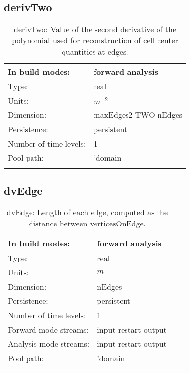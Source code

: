 \subsection[derivTwo]{derivTwo}
\label{subsec:var_sec_mesh_derivTwo}
\begin{center}
\begin{longtable}{| p{2.0in} | p{4.0in} |}
        \hline 
        In build modes: & \hyperref[subsec:forward_var_tab_mesh]{forward} \hyperref[subsec:analysis_var_tab_mesh]{analysis} \\
        \hline 
        Type: & real \\
        \hline 
        Units: & $m^{-2}$ \\
        \hline 
        Dimension: & maxEdges2 TWO nEdges \\
        \hline 
        Persistence: & persistent \\
        \hline 
        Number of time levels: & 1 \\
        \hline 
            Pool path: & 'domain %
 \\
		 \hline 
    \caption{derivTwo: Value of the second derivative of the polynomial used for reconstruction of cell center quantities at edges.}
\end{longtable}
\end{center}
\subsection[dvEdge]{dvEdge}
\label{subsec:var_sec_mesh_dvEdge}
\begin{center}
\begin{longtable}{| p{2.0in} | p{4.0in} |}
        \hline 
        In build modes: & \hyperref[subsec:forward_var_tab_mesh]{forward} \hyperref[subsec:analysis_var_tab_mesh]{analysis} \\
        \hline 
        Type: & real \\
        \hline 
        Units: & $m$ \\
        \hline 
        Dimension: & nEdges \\
        \hline 
        Persistence: & persistent \\
        \hline 
        Number of time levels: & 1 \\
        \hline 
		 Forward mode streams: &  input restart output \\
        \hline 
		 Analysis mode streams: &  input restart output \\
        \hline 
            Pool path: & 'domain %
 \\
		 \hline 
    \caption{dvEdge: Length of each edge, computed as the distance between verticesOnEdge.}
\end{longtable}
\end{center}
